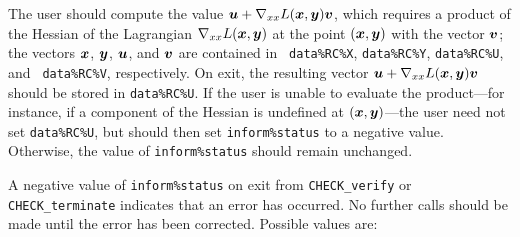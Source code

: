 \documentclass{galahad}
\newcommand{\packagename}{CHECK}
\begin{document}
\begin{description}
 The user should compute the value 
     ${\bm{u}} + \nabla_{xx} L({\bm{x}},{\bm{y}}){\bm{v}}$, which requires a product of the Hessian 
     of the Lagrangian $\nabla_{xx} L({\bm{x}},{\bm{y}})$ at the
     point $({\bm{x}},{\bm{y}})$ with the vector ${\bm{v}}$; the vectors
     ${\bm{x}}$, ${\bm{y}}$, ${\bm{u}}$, and ${\bm{v}}$ are contained in {\tt
       data\%RC\%X}, {\tt data\%RC\%Y}, {\tt data\%RC\%U}, and {\tt
       data\%RC\%V}, respectively.  On exit, the resulting
     vector ${\bm{u}} + \nabla_{xx} L({\bm{x}},{\bm{y}}){\bm{v}}$ should be stored in
     {\tt data\%RC\%U}.  If the user is
     unable to evaluate the product---for instance, 
     if a component of the Hessian is
     undefined at $({\bm{x}},{\bm{y}})$---the user need not set {\tt data\%RC\%U}, but
     should then set {\tt inform\%status} to a negative value.
     Otherwise, the value of {\tt inform\%status} should remain
     unchanged.

\end{description}


\galerrors
A negative value of {\tt inform\%status} on exit from 
{\tt \packagename\_verify}
or 
{\tt \packagename\_terminate}
indicates that an error has occurred. No further calls should be made
until the error has been corrected. Possible values are:
\end{document}
